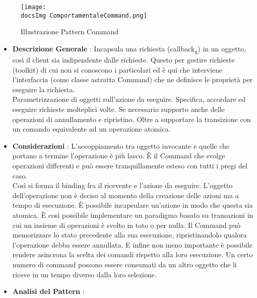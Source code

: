 {{{			\begin{figure}[h]
				\centering
				\texttt{[image: \\docsImg ComportamentaleCommand.png]}
				\caption{Illustrazione Pattern Command}
				\label{Illustrazione Pattern Command}
			\end{figure}
		
			\begin{itemize}\itemsep1pt
				\item \textbf{Descrizione Generale} :  Incapsula una richiesta (callback\textsubscript{g}) in un oggetto, così il client sia indipendente dalle richieste. Questo per gestire richieste (toolkit) di cui non si conoscono i particolari ed è qui che interviene l'interfaccia (come classe astratta Command) che ne definisce le proprietà per eseguire la richiesta.\\
				Parametrizzazione di oggetti sull'azione da eseguire. Specifica, accordare ed eseguire richieste molteplici volte. Se necessario supporto anche delle operazioni di annullamento e ripristino. Oltre a supportare la transizione con un comando equivalente ad un operazione atomica.
				\item \textbf{Considerazioni} : L'accoppiamento tra oggetto invocante e quelle che portano a termine l'operazione è più lasco. È il Command che svolge operazioni differenti e può essere tranquillamente esteso con tutti i pregi del caso.\\
				Così si forma il binding  fra il ricevente e l'azione da eseguire. L'oggetto dell'operazione non è deciso al momento della creazione delle azioni ma a tempo di esecuzione. È possibile incapsulare un'azione in modo che questa sia atomica. È così possibile implementare un paradigma basato su transazioni in cui un insieme di operazioni è svolto in toto o per nulla. Il Command può memorizzare lo stato precedente alla sua esecuzione, ripristinandolo qualora l'operazione debba essere annullata. E infine non meno importante è possibile rendere asincrona la scelta dei comandi rispetto alla loro esecuzione. Un certo numero di command possono essere consumati da un altro oggetto che li riceve in un tempo diverso dalla loro selezione.
				\item \textbf{Analisi del Pattern} : \hfill
				

\end{itemize}}}}
